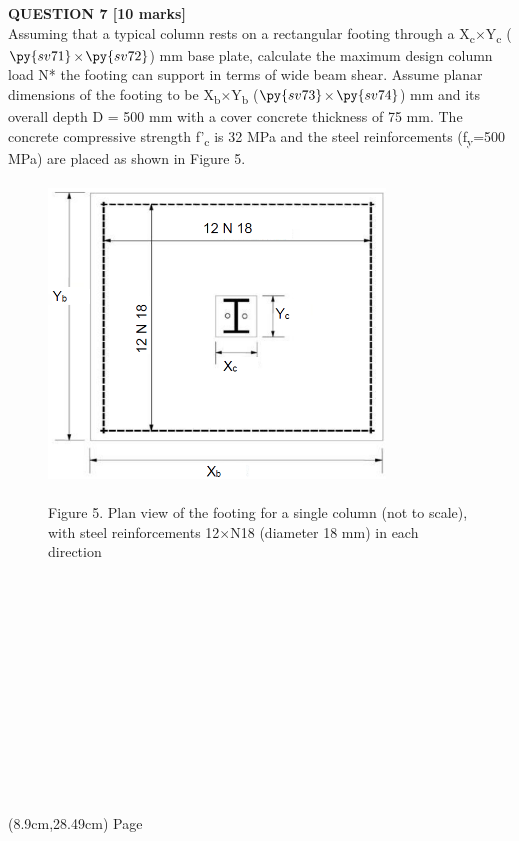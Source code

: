 \documentclass[a4paper,11pt]{article}
\begin{document}
\textbf{QUESTION 7 [10 marks]}\\
Assuming that a typical column rests on a rectangular footing through a X\textsubscript{c}$\times$Y\textsubscript{c} ($\py{sv71}$$\times$$\py{sv72}$) mm base plate, calculate the maximum design column load N* the footing can support in terms of wide beam shear. Assume planar dimensions of the footing to be X\textsubscript{b}$\times$Y\textsubscript{b} ($\py{sv73}$$\times$$\py{sv74}$) mm and its overall depth D = 500 mm with a cover concrete thickness of 75 mm. The concrete compressive strength f'\textsubscript{c} is 32 MPa and the steel reinforcements (f\textsubscript{y}=500 MPa) are placed as shown in Figure 5.\\
\begin{figure}[ht]
\includegraphics[width=8.94cm, height=8cm]{Figure5.png}\\
{\centering Figure 5. Plan view of the footing for a single column (not to scale), with steel reinforcements 12$\times$N18 (diameter 18 mm) in each direction\par}\\
\end{figure}
\\
\\
\\
\\
\\
\\
\\
\\
\begin{figure}[ht]
\par\\
\end{figure}
\begin{textblock*}{5cm}(8.9cm,28.49cm)
Page
\end{textblock*}
\end{document}
